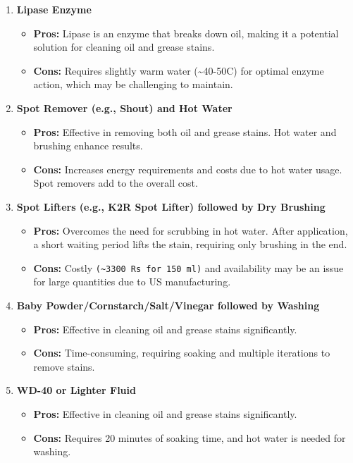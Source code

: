 \documentclass[table,french,english]{rapportCS}
\begin{document}
\begin{enumerate}
    \item \textbf{\gls{Lipase}  Enzyme}
    \begin{itemize}[label=$\bullet$]
        \item \textbf{Pros:} Lipase is an enzyme that breaks down oil, making it a potential solution for cleaning oil and grease stains.
        \item \textbf{Cons:} Requires slightly warm water (\textasciitilde40-50\textdegree C) for optimal enzyme action, which may be challenging to maintain.
    \end{itemize}

    \item \textbf{Spot Remover (e.g., Shout) and Hot Water}
    \begin{itemize}[label=$\bullet$]
        \item \textbf{Pros:} Effective in removing both oil and grease stains. Hot water and brushing enhance results.
        \item \textbf{Cons:} Increases energy requirements and costs due to hot water usage. Spot removers add to the overall cost.
    \end{itemize}

    \item \textbf{Spot Lifters (e.g., K2R Spot Lifter) followed by Dry Brushing}
    \begin{itemize}[label=$\bullet$]
        \item \textbf{Pros:} Overcomes the need for scrubbing in hot water. After application, a short waiting period lifts the stain, requiring only brushing in the end.
        \item \textbf{Cons:} Costly \texttt{(\textasciitilde{3300} Rs for 150 ml)} and availability may be an issue for large quantities due to US manufacturing.
    \end{itemize}

    \item \textbf{Baby Powder/Cornstarch/Salt/Vinegar followed by Washing}
    \begin{itemize}[label=$\bullet$]
        \item \textbf{Pros:} Effective in cleaning oil and grease stains significantly.
        \item \textbf{Cons:} Time-consuming, requiring soaking and multiple iterations to remove stains.
    \end{itemize}

    \item \textbf{WD-40 or Lighter Fluid}
    \begin{itemize}[label=$\bullet$]
        \item \textbf{Pros:} Effective in cleaning oil and grease stains significantly.
        \item \textbf{Cons:} Requires 20 minutes of soaking time, and hot water is needed for washing.
    \end{itemize}


\end{enumerate}
\end{document}
